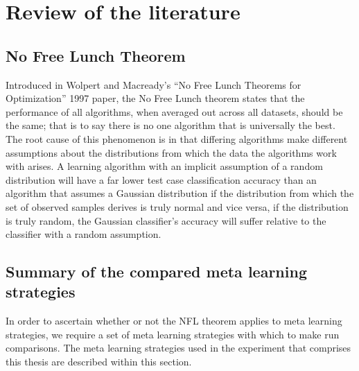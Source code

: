 \chapter{Review of the literature}
\label{Chapter2}
\section{No Free Lunch Theorem}
Introduced in Wolpert and Macready's ``No Free Lunch Theorems for Optimization''
1997 paper, the No Free Lunch theorem states that the performance of all
algorithms, when averaged out across all datasets, should be the same; that is
to say there is no one algorithm that is universally the best. The root cause of
this phenomenon is in that differing algorithms make different assumptions
about the distributions from which the data the algorithms work with arises. A
learning algorithm with an implicit assumption of a random distribution will
have a far lower test case classification accuracy than an algorithm that
assumes a Gaussian distribution if the distribution from which the set of
observed samples derives is truly normal and vice versa, if the
distribution is truly random, the Gaussian classifier's accuracy will suffer
relative to the classifier with a random assumption.
\section{Summary of the compared meta learning strategies}
In order to ascertain whether or not the NFL theorem applies to meta learning strategies,
we require a set of meta learning strategies with which to make run comparisons. The
meta learning strategies used in the experiment that comprises this thesis are described within
this section.
